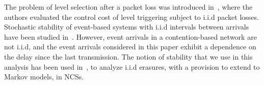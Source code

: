 \documentclass[twocolumn]{autart}
\begin{document}
The problem of level selection after a packet loss was introduced in~\cite{Rabi2009}, where the authors evaluated the control cost of level triggering subject to i.i.d packet losses. Stochastic stability of event-based systems with i.i.d intervals between arrivals have been studied in~\cite{Antunes2011,Lemmon2011}. However, event arrivals in a contention-based network are not i.i.d, and the event arrivals considered in this paper exhibit a dependence on the delay since the last transmission. The notion of stability that we use in this analysis has been used in~\cite{Gupta2010}, to analyze i.i.d erasures, with a provision to extend to Markov models, in NCSs.

\begin{figure*}[tb]
\begin{center}


\begingroup
  \makeatletter
  \providecommand\color[2][]{\errmessage{(Inkscape) Color is used for the text in Inkscape, but the package 'color.sty' is not loaded}
    \renewcommand\color[2][]{}}
  \providecommand\transparent[1]{\errmessage{(Inkscape) Transparency is used (non-zero) for the text in Inkscape, but the package 'transparent.sty' is not loaded}
    \renewcommand\transparent[1]{}}
  \providecommand\rotatebox[2]{#2}
  \ifx\svgwidth\undefined
    \setlength{\unitlength}{479.39765625pt}
  \else
    \setlength{\unitlength}{\svgwidth}
  \fi
  \global\let\svgwidth\undefined
  \makeatother

\end{center}
\end{figure*}
\end{document}
